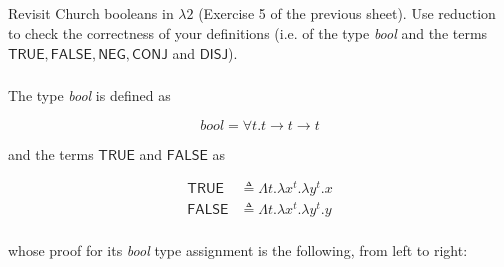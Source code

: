\documentclass{article}
\begin{document}
\subsection{}\label{ex:7}

Revisit Church booleans in $\lambda 2$ (Exercise 5 of the
previous sheet). Use reduction to check the correctness
of your definitions (i.e. of the type \textit{bool} and the
terms $\mathsf{TRUE}, \mathsf{FALSE}, \mathsf{NEG}, 
\mathsf{CONJ}$ and $\textsf{DISJ}$).

\subsubsection{}

The type \textit{bool} is defined as 

$$
\textit{bool} = \forall t. t \rightarrow t \rightarrow t
$$

and the terms $\mathsf{TRUE}$ and $\mathsf{FALSE}$ as

\begin{align*}
  \mathsf{TRUE} &\triangleq 
    \Lambda t. \lambda x^t. \lambda y^t. x \\
  \mathsf{FALSE} &\triangleq 
    \Lambda t. \lambda x^t. \lambda y^t. y \\
\end{align*}

whose proof for its \textit{bool} type assignment is 
the following, from left to right:

\begin{minipage}[t][3.3cm][t]{.4\textwidth}
\begin{mathpar}
\end{mathpar}
\end{minipage}
\hfill
\begin{minipage}[t]{.4\textwidth}
\begin{mathpar}
\end{mathpar}
\end{minipage}
\end{document}
